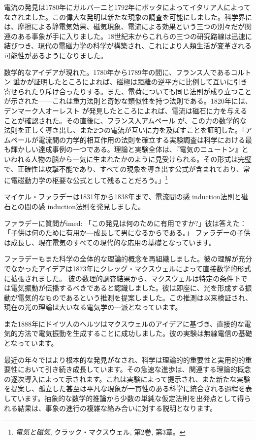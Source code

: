 \documentclass[a4paper,11pt,openany]{ltjsbook}
\providecommand{\Title}[1]{\textit{#1}}
\begin{document}
電流の発見は1780年にガルバーニと1792年にボッタによってイタリア人によってなされました。この偉大な発明は新たな現象の調査を可能にしました。科学界には、摩擦による静電気効果、磁気現象、電流による効果という三つの別々だが関連のある事象が手に入りました。18世紀末からこれらの三つの研究路線は迅速に結びつき、現代の電磁力学の科学が構築され、これにより人類生活が変革される可能性があるようになりました。

数学的なアイデアが現れた。1780年から1789年の間に、フランス人であるコルトン  誰かが証明したところによれば、磁極は距離の逆平方に比例して互いに引き寄せられたり斥け合ったりする。また、電荷についても同じ法則が成り立つことが示された——これは重力法則と奇妙な類似性を持つ法則である。1820年には、デンマーク人オーレスト  が発見したところによれば、電流は磁石に力を与えることが確認された。その直後に、フランス人アムペール  が、この力の数学的な法則を正しく導き出し、また2つの電流が互いに力を及ぼすことを証明した。「アムペールが電流間の力学的相互作用の法則を確立する実験調査は科学における最も輝かしい達成事例の一つである。理論と実験全体は、『電気のニュートン』といわれる人物の脳から一気に生まれたかのように見受けられる。その形式は完璧で、正確性は攻撃不能であり、すべての現象を導き出す公式が含まれており、常に電磁動力学の枢要な公式として残ることだろう。」\footnote{\Title{電気と磁気}, クラック・マクスウェル, 第2巻, 第3章。}

マイケル・ファラデーは1831年から1838年まで、電流間の感 induction法則と磁石との間の感 induction法則を発見しました。

ファラデーに質問がimed: 「この発見は何のために有用ですか?」彼は答えた：「子供は何のために有用か---成長して男になるからである。」
ファラデーの子供は成長し、現在電気のすべての現代的な応用の基礎となっています。

ファラデーもまた科学の全体的な理論的概念を再組織しました。彼の理解が充分でなかったアイデアは1873年にクレッグ・マクスウェルによって直接数学的形式に拡張されました。
彼の数理的調査結果から、マクスウェルは特定の条件下では電気振動が伝播するべきであると認識しました。彼は即座に、光を形成する振動が電気的なものであるという推測を提案しました。この推測は以来検証され、現在の光の理論は大いなる電気学の一派となっています。

また1888年にドイツ人のヘルツはマクスウェルのアイデアに基づき、直接的な電気的方法で電気振動を生成することに成功しました。彼の実験は無線電信の基礎となっています。

最近の年々ではより根本的な発見がなされ、科学は理論的的重要性と実用的的重要性において引き続き成長しています。その急速な進歩は、関連する理論的概念の逐次導入によって示されます。これは実験によって提示され、また新たな実験を提案し、孤立した甚至は平凡な現象が一貫性のある科学に統合される過程を表しています。抽象的な数学的推論から少数の単純な仮定法則を出発点として得られる結果は、事象の進行の複雑な絡み合いに対する説明となります。
\end{document}

